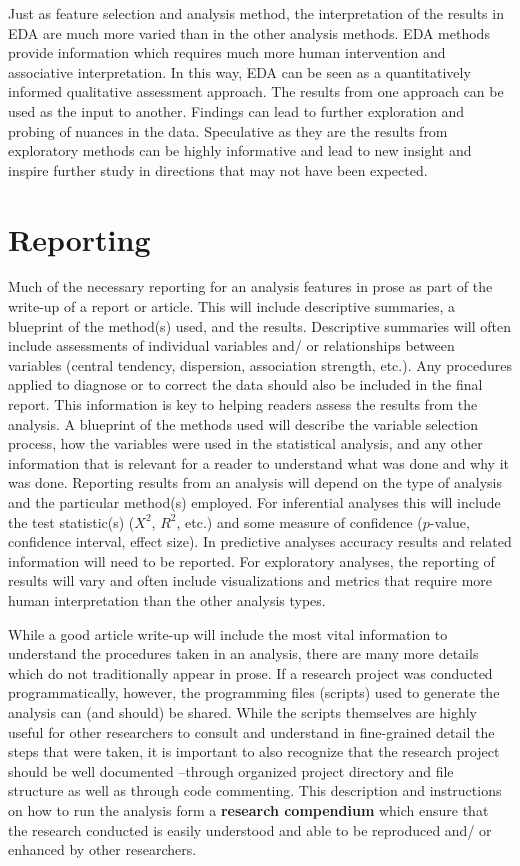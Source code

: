 \documentclass[
  letterpaper,
]{latex/krantz}
\begin{document}
Just as feature selection and analysis method, the interpretation of the
results in EDA are much more varied than in the other analysis methods.
EDA methods provide information which requires much more human
intervention and associative interpretation. In this way, EDA can be
seen as a quantitatively informed qualitative assessment approach. The
results from one approach can be used as the input to another. Findings
can lead to further exploration and probing of nuances in the data.
Speculative as they are the results from exploratory methods can be
highly informative and lead to new insight and inspire further study in
directions that may not have been expected.

\hypertarget{reporting}{%
\section{Reporting}\label{reporting}}

Much of the necessary reporting for an analysis features in prose as
part of the write-up of a report or article. This will include
descriptive summaries, a blueprint of the method(s) used, and the
results. Descriptive summaries will often include assessments of
individual variables and/ or relationships between variables (central
tendency, dispersion, association strength, etc.). Any procedures
applied to diagnose or to correct the data should also be included in
the final report. This information is key to helping readers assess the
results from the analysis. A blueprint of the methods used will describe
the variable selection process, how the variables were used in the
statistical analysis, and any other information that is relevant for a
reader to understand what was done and why it was done. Reporting
results from an analysis will depend on the type of analysis and the
particular method(s) employed. For inferential analyses this will
include the test statistic(s) (\(X^2\), \(R^2\), etc.) and some measure
of confidence (\(p\)-value, confidence interval, effect size). In
predictive analyses accuracy results and related information will need
to be reported. For exploratory analyses, the reporting of results will
vary and often include visualizations and metrics that require more
human interpretation than the other analysis types.

While a good article write-up will include the most vital information to
understand the procedures taken in an analysis, there are many more
details which do not traditionally appear in prose. If a research
project was conducted programmatically, however, the programming files
(scripts) used to generate the analysis can (and should) be shared.
While the scripts themselves are highly useful for other researchers to
consult and understand in fine-grained detail the steps that were taken,
it is important to also recognize that the research project should be
well documented --through organized project directory and file structure
as well as through code commenting. This description and instructions on
how to run the analysis form a \textbf{research compendium} which ensure
that the research conducted is easily understood and able to be
reproduced and/ or enhanced by other researchers.
\end{document}
